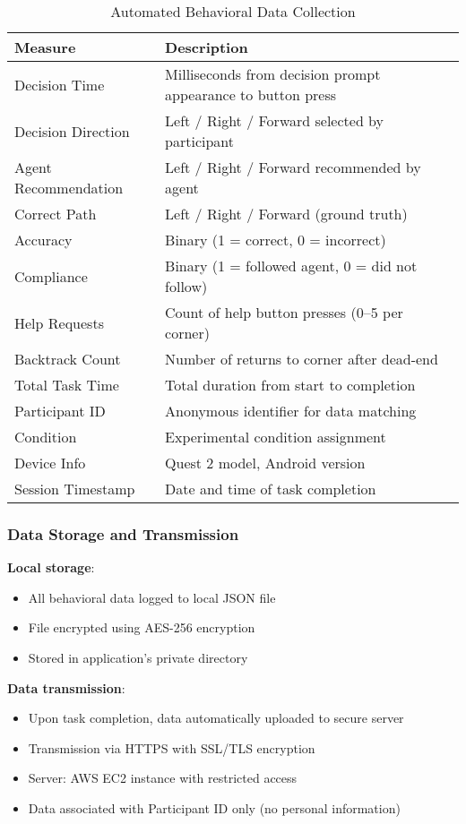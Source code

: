 \documentclass[12pt]{article}
\begin{document}
\begin{table}[h]
\centering
\caption{Automated Behavioral Data Collection}
\begin{tabular}{p{}p{}}
\toprule
\textbf{Measure} & \textbf{Description} \\
\midrule
Decision Time & Milliseconds from decision prompt appearance to button press \\
Decision Direction & Left / Right / Forward selected by participant \\
Agent Recommendation & Left / Right / Forward recommended by agent \\
Correct Path & Left / Right / Forward (ground truth) \\
Accuracy & Binary (1 = correct, 0 = incorrect) \\
Compliance & Binary (1 = followed agent, 0 = did not follow) \\
Help Requests & Count of help button presses (0--5 per corner) \\
Backtrack Count & Number of returns to corner after dead-end \\
Total Task Time & Total duration from start to completion \\
Participant ID & Anonymous identifier for data matching \\
Condition & Experimental condition assignment \\
Device Info & Quest 2 model, Android version \\
Session Timestamp & Date and time of task completion \\
\bottomrule
\end{tabular}
\end{table}

\subsubsection{Data Storage and Transmission}

\textbf{Local storage}:
\begin{itemize}
    \item All behavioral data logged to local JSON file
    \item File encrypted using AES-256 encryption
    \item Stored in application's private directory
\end{itemize}

\textbf{Data transmission}:
\begin{itemize}
    \item Upon task completion, data automatically uploaded to secure server
    \item Transmission via HTTPS with SSL/TLS encryption
    \item Server: AWS EC2 instance with restricted access
    \item Data associated with Participant ID only (no personal information)
\end{itemize}
\end{document}
